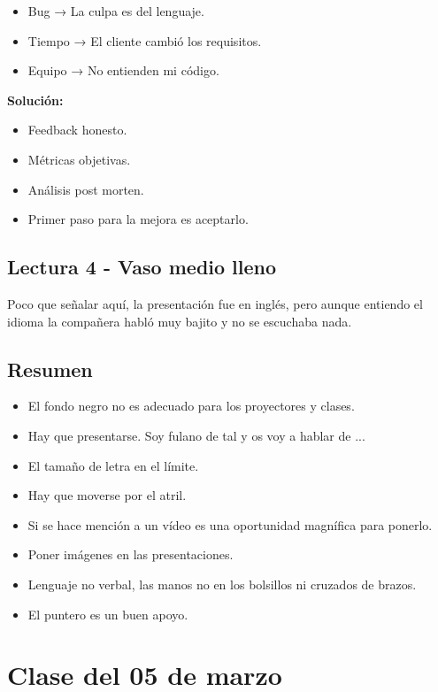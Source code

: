 \documentclass[12pt, a4paper, twoside]{article}
\begin{document}
\begin{itemize}
    \item{Bug → La culpa es del lenguaje.}
    \item{Tiempo → El cliente cambió los requisitos.}
    \item{Equipo → No entienden mi código.}
\end{itemize}

\noindent\textbf{Solución:}

\begin{itemize}
    \item{Feedback honesto.}
    \item{Métricas objetivas.}
    \item{Análisis post morten.}
    \item{Primer paso para la mejora es aceptarlo.}
\end{itemize}

\subsection{Lectura 4 - Vaso medio lleno}
Poco que señalar aquí, la presentación fue en inglés, pero aunque entiendo el idioma la 
compañera habló muy bajito y no se escuchaba nada.\\

\subsection{Resumen}
\begin{itemize}
    \item El fondo negro no es adecuado para los proyectores y clases.
    \item Hay que presentarse. Soy fulano de tal y os voy a hablar de ...
    \item El tamaño de letra en el límite.
    \item Hay que moverse por el atril.
    \item Si se hace mención a un vídeo es una oportunidad magnífica para ponerlo.
    \item Poner imágenes en las presentaciones.
    \item Lenguaje no verbal, las manos no en los bolsillos ni cruzados de brazos.
    \item El puntero es un buen apoyo.
    
\end{itemize}

\newpage

\section{Clase del 05 de marzo}
\end{document}
